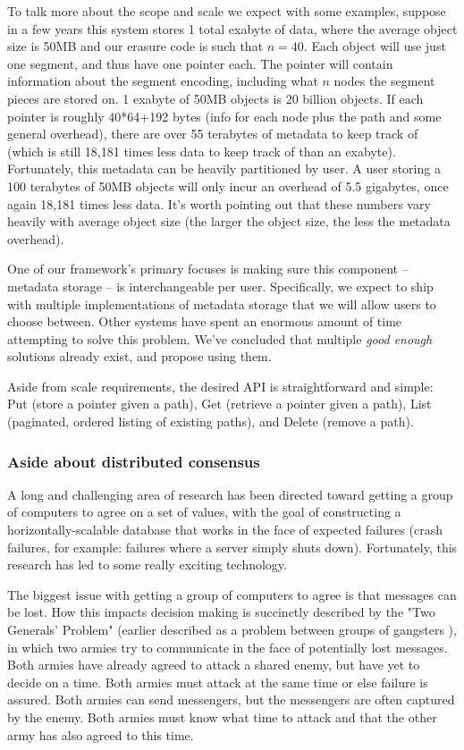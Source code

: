 \documentclass[a4paper,10pt]{article} \usepackage[utf8]{inputenc}
\begin{document}
To talk more about the scope and scale we expect with some examples, suppose in
a few years this system stores 1 total exabyte of data, where the average object
size is 50MB and our erasure code is such that $n=40$. Each object will use just
one segment, and thus have one pointer each. The pointer will contain
information about the segment encoding, including what $n$ nodes the segment
pieces are stored on. 1 exabyte of 50MB objects is 20 billion objects. If
each pointer is roughly 40*64+192 bytes (info for each node plus the path and
some general overhead), there are over 55 terabytes of metadata to keep track of
(which is still 18,181 times less data to keep track of than an exabyte).
Fortunately, this metadata can be heavily partitioned by user. A user storing a
100 terabytes of 50MB objects will only incur an overhead of 5.5 gigabytes, once
again 18,181 times less data. It's worth pointing out that these numbers vary
heavily with average object size (the larger the object size, the less the
metadata overhead).

One of our framework's primary focuses is making sure this component -- metadata
storage -- is interchangeable per user. Specifically, we expect to ship with
multiple implementations of metadata storage that we will allow users to choose
between. Other systems have spent an enormous amount of time attempting to solve
this problem. We've concluded that multiple {\em good enough} solutions already
exist, and propose using them.

Aside from scale requirements, the desired API is straightforward and
simple: Put (store a pointer given a path), Get (retrieve a pointer given a
path), List (paginated, ordered listing of existing paths), and Delete (remove a
path).

\subsubsection{Aside about distributed consensus}

A long and challenging area of research has been directed toward getting a
group of computers to agree on a set of values, with the goal of constructing a
horizontally-scalable database that works in the face of expected failures
(crash failures, for example: failures where a server simply shuts down).
Fortunately, this research has led to some really exciting technology.

The biggest issue with getting a group of computers to agree is that messages
can be lost. How this impacts decision making is succinctly described by the
"Two Generals' Problem" \cite{two-generals} (earlier described as a problem
between groups of gangsters \cite{two-gangsters}), in which two armies try to
communicate in the face of potentially lost messages. Both armies have already
agreed to attack a shared enemy, but have yet to decide on a time. Both armies
must attack at the same time or else failure is assured. Both armies can send
messengers, but the messengers are often captured by the enemy. Both armies must
know what time to attack and that the other army has also agreed to this time.
\end{document}
